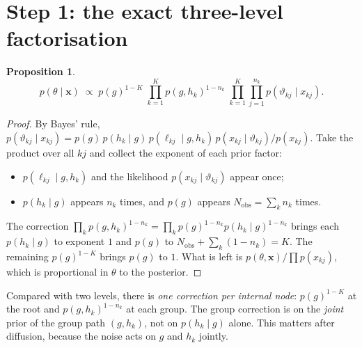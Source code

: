 \documentclass[11pt]{article}
\newtheorem{proposition}[theorem]{Proposition}
\theoremstyle{definition}
\theoremstyle{remark}
\newcommand{\X}{\mathbf{x}}
\newcommand{\hk}{h_k}
\newcommand{\lkj}{\ell_{kj}}
\newcommand{\vkj}{\vartheta_{kj}} %
\begin{document}
\section{Step 1: the exact three-level factorisation}\label{sec:factorisation}

\begin{proposition}\label{prop:clean}
\begin{equation}\label{eq:clean}
p(\theta\mid\X)\;\propto\;p(g)^{1-K}\;\prod_{k=1}^Kp(g,\hk)^{1-n_k}\;\prod_{k=1}^K\prod_{j=1}^{n_k}p(\vkj\mid x_{kj}).
\end{equation}
\end{proposition}
\begin{proof}
By Bayes' rule, $p(\vkj\mid x_{kj})=p(g)\,p(\hk\mid g)\,p(\lkj\mid g,\hk)\,p(x_{kj}\mid\vkj)/p(x_{kj})$.
Take the product over all $kj$ and collect the exponent of each prior factor:
\begin{itemize}
\item $p(\lkj\mid g,\hk)$ and the likelihood $p(x_{kj}\mid\vkj)$ appear once;
\item $p(\hk\mid g)$ appears $n_k$ times, and $p(g)$ appears $N_\text{obs}=\sum_kn_k$ times.
\end{itemize}
The correction $\prod_kp(g,\hk)^{1-n_k}=\prod_kp(g)^{1-n_k}p(\hk\mid g)^{1-n_k}$
brings each $p(\hk\mid g)$ to exponent $1$ and $p(g)$ to
$N_\text{obs}+\sum_k(1-n_k)=K$. The remaining $p(g)^{1-K}$ brings $p(g)$ to $1$.
What is left is $p(\theta,\X)/\prod p(x_{kj})$, which is proportional in $\theta$
to the posterior.
\end{proof}

Compared with two levels, there is \emph{one correction per internal node}:
$p(g)^{1-K}$ at the root and $p(g,\hk)^{1-n_k}$ at each group. The group
correction is on the \emph{joint} prior of the group path $(g,\hk)$, not on
$p(\hk\mid g)$ alone. This matters after diffusion, because the noise acts on
$g$ and $\hk$ jointly.
\end{document}
